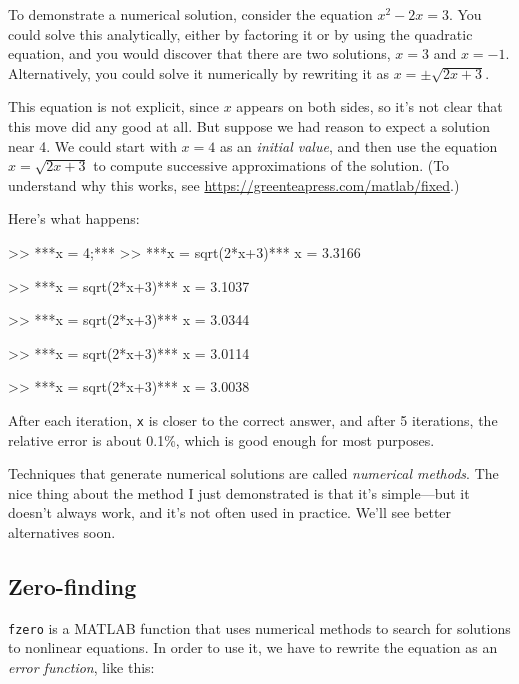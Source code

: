 
To demonstrate a numerical solution, consider the equation $x^2 - 2x =
3$.  You could solve this analytically, either by factoring it or by
using the quadratic equation, and you would discover that there are
two solutions, $x=3$ and $x=-1$.  Alternatively, you could solve it
numerically by rewriting it as $x = \pm \sqrt{2x+3}$.

This equation is not explicit, since $x$ appears on both sides, so
it's not clear that this move did any good at all.  But suppose we had
reason to expect a solution near 4.
We could start with $x=4$ as an {\em initial value}, and then use
the equation $x = \sqrt{2x+3}$ to compute successive
approximations of the solution. (To understand why this
works, see \url{https://greenteapress.com/matlab/fixed}.)


Here's what happens:

\begin{code}
>> ***x = 4;***
>> ***x = sqrt(2*x+3)***
x = 3.3166

>> ***x = sqrt(2*x+3)***
x = 3.1037

>> ***x = sqrt(2*x+3)***
x = 3.0344

>> ***x = sqrt(2*x+3)***
x = 3.0114

>> ***x = sqrt(2*x+3)***
x = 3.0038
\end{code}

After each iteration, {\tt x} is closer to the correct answer,
and after 5 iterations, the relative error is about 0.1\%, which
is good enough for most purposes.


Techniques that generate numerical solutions are called
\emph{numerical methods}.  
The nice thing about the method I
just demonstrated is that it's simple---but it doesn't always
work, and it's not often used in practice.
We'll see better alternatives soon.

\subsection{Zero-finding}
\label{zero}


{\tt fzero} is a MATLAB function that uses numerical methods to search for solutions to nonlinear equations.  In order to use it, we have to rewrite the equation as an {\em error function}, like this:

